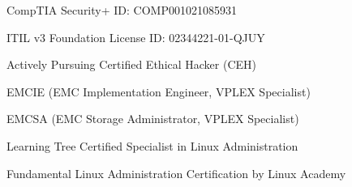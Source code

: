 
\begin{cvcerts}
  \cvcert
    {CompTIA Security+} %
    {ID: COMP001021085931} %

  \cvcert
    {ITIL v3 Foundation} %
    {License ID: 02344221-01-QJUY} %

  \cvcert
    {Actively Pursuing Certified Ethical Hacker (CEH)} %
    {} %

  \cvcert
    {EMCIE (EMC Implementation Engineer, VPLEX Specialist)} %
    {} %

  \cvcert
    {EMCSA (EMC Storage Administrator, VPLEX Specialist)} %
    {} %

  \cvcert
    {Learning Tree Certified Specialist in Linux Administration} %
    {} %

  \cvcert
    {Fundamental Linux Administration Certification by Linux Academy} %
    {} %

\end{cvcerts}
